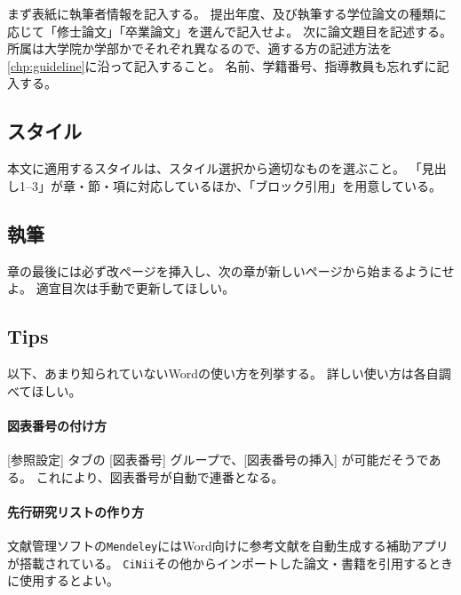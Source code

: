 			まず表紙に執筆者情報を記入する。
			提出年度、及び執筆する学位論文の種類に応じて「修士論文」「卒業論文」を選んで記入せよ。
			次に論文題目を記述する。
			所属は大学院か学部かでそれぞれ異なるので、適する方の記述方法を\cref{chp:guideline}に沿って記入すること。
			名前、学籍番号、指導教員も忘れずに記入する。

		\subsection{スタイル}
			\label{sub:style_w}

			本文に適用するスタイルは、スタイル選択から適切なものを選ぶこと。
			「見出し1--3」が章・節・項に対応しているほか、「ブロック引用」を用意している。

		\subsection{執筆}
			\label{sub:writing_w}

			章の最後には必ず改ページを挿入し、次の章が新しいページから始まるようにせよ。
			適宜目次は手動で更新してほしい。


		\subsection{Tips}
			\label{tips}

			以下、あまり知られていないWordの使い方を列挙する。
			詳しい使い方は各自調べてほしい。

			\paragraph{図表番号の付け方}

				[参照設定] タブの [図表番号] グループで、[図表番号の挿入] が可能だそうである。
				これにより、図表番号が自動で連番となる。

			\paragraph{先行研究リストの作り方}

				文献管理ソフトの\texttt{Mendeley}にはWord向けに参考文献を自動生成する補助アプリが搭載されている。
				\texttt{CiNii}その他からインポートした論文・書籍を引用するときに使用するとよい。
